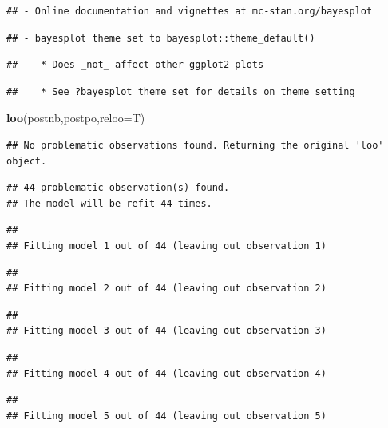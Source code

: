 \documentclass[]{article}
\newenvironment{Shaded}{\begin{snugshade}}{\end{snugshade}}
\newcommand{\DataTypeTok}[1]{\textcolor[rgb]{0.13,0.29,0.53}{#1}}
\newcommand{\KeywordTok}[1]{\textcolor[rgb]{0.13,0.29,0.53}{\textbf{#1}}}
\newcommand{\NormalTok}[1]{#1}
\begin{document}
\begin{verbatim}
## - Online documentation and vignettes at mc-stan.org/bayesplot
\end{verbatim}

\begin{verbatim}
## - bayesplot theme set to bayesplot::theme_default()
\end{verbatim}

\begin{verbatim}
##    * Does _not_ affect other ggplot2 plots
\end{verbatim}

\begin{verbatim}
##    * See ?bayesplot_theme_set for details on theme setting
\end{verbatim}

\begin{Shaded}
\begin{Highlighting}[]
\KeywordTok{loo}\NormalTok{(postnb,postpo,}\DataTypeTok{reloo=}\NormalTok{T)}
\end{Highlighting}
\end{Shaded}

\begin{verbatim}
## No problematic observations found. Returning the original 'loo' object.
\end{verbatim}

\begin{verbatim}
## 44 problematic observation(s) found.
## The model will be refit 44 times.
\end{verbatim}

\begin{verbatim}
## 
## Fitting model 1 out of 44 (leaving out observation 1)
\end{verbatim}

\begin{verbatim}
## 
## Fitting model 2 out of 44 (leaving out observation 2)
\end{verbatim}

\begin{verbatim}
## 
## Fitting model 3 out of 44 (leaving out observation 3)
\end{verbatim}

\begin{verbatim}
## 
## Fitting model 4 out of 44 (leaving out observation 4)
\end{verbatim}

\begin{verbatim}
## 
## Fitting model 5 out of 44 (leaving out observation 5)
\end{verbatim}
\end{document}
